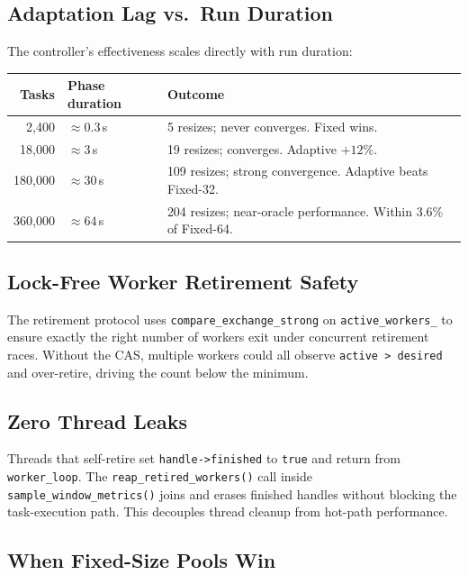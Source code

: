 \documentclass[12pt,a4paper]{article}
\begin{document}
\subsection{Adaptation Lag vs.\ Run Duration}

The controller's effectiveness scales directly with run duration:

\begin{center}
\begin{tabular}{rll}
\toprule
\textbf{Tasks} & \textbf{Phase duration} & \textbf{Outcome} \\
\midrule
  2,400 & $\approx 0.3$\,s & 5 resizes; never converges. Fixed wins. \\
 18,000 & $\approx 3$\,s   & 19 resizes; converges. Adaptive $+12\%$. \\
180,000 & $\approx 30$\,s  & 109 resizes; strong convergence.
                              Adaptive beats Fixed-32. \\
360,000 & $\approx 64$\,s  & 204 resizes; near-oracle performance.
                              Within 3.6\% of Fixed-64. \\
\bottomrule
\end{tabular}
\end{center}

\subsection{Lock-Free Worker Retirement Safety}

The retirement protocol uses \texttt{compare\_exchange\_strong} on
\texttt{active\_workers\_} to ensure exactly the right number of workers
exit under concurrent retirement races.
Without the CAS, multiple workers could all observe
\texttt{active > desired} and over-retire, driving the count below the
minimum.

\subsection{Zero Thread Leaks}

Threads that self-retire set \texttt{handle->finished} to \texttt{true}
and return from \texttt{worker\_loop}.
The \texttt{reap\_retired\_workers()} call inside
\texttt{sample\_window\_metrics()} joins and erases finished handles
without blocking the task-execution path.
This decouples thread cleanup from hot-path performance.

\subsection{When Fixed-Size Pools Win}
\end{document}
